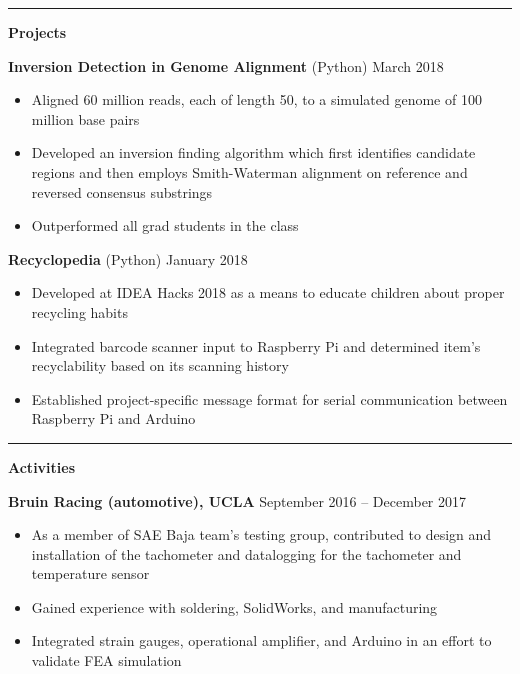\documentclass[11pt]{article}
\begin{document}
\rule[10pt]{\textwidth}{.75pt} \vspace{-20pt}
\setlength{\parindent}{0.55em}\par
\textbf{\Large Projects} \vspace{4pt}\setlength{\parindent}{1.5em}\par
\textbf{Inversion Detection in Genome Alignment} (Python) \hfill March 2018 \vspace{-6pt} \setlength{\parindent}{3em}\par 
\begin{itemize}[leftmargin=15.2mm]
	\setlength\itemsep{-.4em}
	\item Aligned 60 million reads, each of length 50, to a simulated genome of 100 million base pairs
	\item Developed an inversion finding algorithm which first identifies candidate regions and then employs  Smith-Waterman alignment on reference and reversed consensus substrings
	\item Outperformed all grad students in the class
\end{itemize} \vspace{-6pt} \setlength{\parindent}{1.5em}\par
\textbf{Recyclopedia} (Python) \hfill January 2018 \vspace{-6pt} \setlength{\parindent}{3em}\par 
\begin{itemize}[leftmargin=15.2mm]
	\setlength\itemsep{-.4em}
	\item Developed at IDEA Hacks 2018 as a means to educate children about proper recycling habits
	\item Integrated barcode scanner input to Raspberry Pi and determined item's recyclability based on its scanning history
	\item Established project-specific message format for serial communication between Raspberry Pi and Arduino
\end{itemize}
\rule[10pt]{\textwidth}{.75pt} \vspace{-20pt}
\setlength{\parindent}{0.55em}\par
\textbf{\Large Activities} \vspace{4pt}\setlength{\parindent}{1.5em}\par
\textbf{Bruin Racing (automotive), UCLA} \hfill September 2016 -- December 2017 \vspace{-6pt} \setlength{\parindent}{3em}\par 
\begin{itemize}[leftmargin=15.2mm]
	\setlength\itemsep{-.4em}
	\item As a member of SAE Baja team's testing group, contributed to design and installation of the tachometer and datalogging for the tachometer and temperature sensor
	\item Gained experience with soldering, SolidWorks, and manufacturing
	\item Integrated strain gauges, operational amplifier, and Arduino in an effort to validate FEA simulation
\end{itemize}
\end{document}

